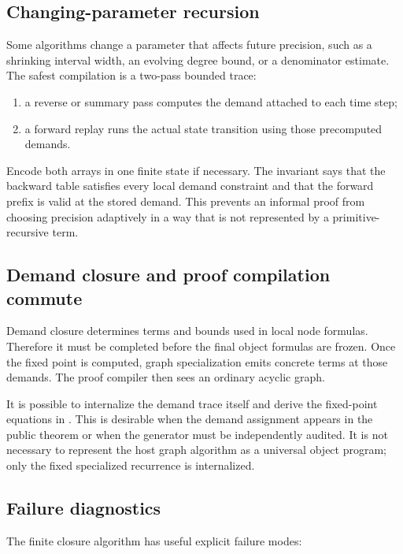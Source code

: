 \subsection{Changing-parameter recursion}

Some algorithms change a parameter that affects future precision, such as a shrinking interval width, an evolving degree bound, or a denominator estimate.  The safest compilation is a two-pass bounded trace:

\begin{enumerate}
\item a reverse or summary pass computes the demand attached to each time step;
\item a forward replay runs the actual state transition using those precomputed demands.
\end{enumerate}

Encode both arrays in one finite state if necessary.  The invariant says that the backward table satisfies every local demand constraint and that the forward prefix is valid at the stored demand.  This prevents an informal proof from choosing precision adaptively in a way that is not represented by a primitive-recursive term.

\subsection{Demand closure and proof compilation commute}

Demand closure determines terms and bounds used in local node formulas.  Therefore it must be completed before the final object formulas are frozen.  Once the fixed point is computed, graph specialization emits concrete terms at those demands.  The proof compiler then sees an ordinary acyclic graph.

It is possible to internalize the demand trace itself and derive the fixed-point equations in \iPRA.  This is desirable when the demand assignment appears in the public theorem or when the generator must be independently audited.  It is not necessary to represent the host graph algorithm as a universal object program; only the fixed specialized recurrence is internalized.

\subsection{Failure diagnostics}

The finite closure algorithm has useful explicit failure modes:

